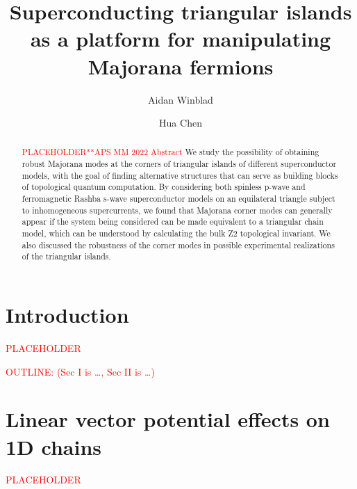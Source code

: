 \documentclass[aps,prb,showpacs,twocolumn,amsmath,amssymb,superscriptaddress]{revtex4-2}
\newcommand{\Red}[1]{\textcolor{red}{#1}}
\begin{document}
\title{Superconducting triangular islands as a platform for manipulating Majorana fermions}

\author{Aidan Winblad}

\author{Hua Chen}


\begin{abstract}
  \Red{PLACEHOLDER**APS MM 2022 Abstract}
  We study the possibility of obtaining robust Majorana modes at the corners of triangular islands of different superconductor models, with the goal of finding alternative structures that can serve as building blocks of topological quantum computation.
  By considering both spinless p-wave and ferromagnetic Rashba s-wave superconductor models on an equilateral triangle subject to inhomogeneous supercurrents, we found that Majorana corner modes can generally appear if the system being considered can be made equivalent to a triangular chain model, which can be understood by calculating the bulk Z2 topological invariant.
  We also discussed the robustness of the corner modes in possible experimental realizations of the triangular islands.
\end{abstract}

\maketitle

\section{Introduction}
\Red{PLACEHOLDER}


\Red{OUTLINE: (Sec I is \dots, Sec II is \dots)}
\section{Linear vector potential effects on 1D chains}
\Red{PLACEHOLDER}
\end{document}

